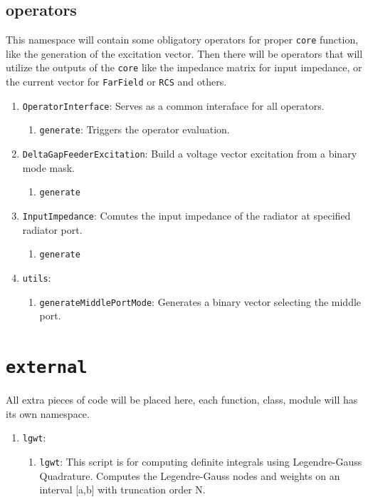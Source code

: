 \documentclass[9pt]{article}
\begin{document}
    \subsection{operators}

    This namespace will contain some obligatory operators for proper \texttt{core} function, like the generation of the excitation vector. Then there will be operators that will utilize the outputs of the \texttt{core} like the impedance matrix for input impedance, or the current vector for \texttt{FarField} or \texttt{RCS} and others.

    \begin{enumerate}[label=\Roman*.]
        \item \texttt{OperatorInterface}: Serves as a common interaface for all operators.
        \begin{enumerate}[label=\roman*.]
            \item \texttt{generate}: Triggers the operator evaluation.
        \end{enumerate}
        \item \texttt{DeltaGapFeederExcitation}: Build a voltage vector excitation from a binary mode mask.
        \begin{enumerate}[label=\roman*.]
            \item \texttt{generate}
        \end{enumerate}
        \item \texttt{InputImpedance}: Comutes the input impedance of the radiator at specified radiator port.
        \begin{enumerate}[label=\roman*.]
            \item \texttt{generate}
        \end{enumerate}
        \item \texttt{utils}:
        \begin{enumerate}[label=\roman*.]
            \item \texttt{generateMiddlePortMode}: Generates a binary vector selecting the middle port.
        \end{enumerate}
    \end{enumerate}

    \section{\texttt{external}}

    All extra pieces of code will be placed here, each function, class, module will has its own namespace.

    \begin{enumerate}[label=\Roman*.]
        \item \texttt{lgwt}:
        \begin{enumerate}[label=\roman*.]
            \item \texttt{lgwt}: This script is for computing definite integrals using Legendre-Gauss Quadrature. Computes the Legendre-Gauss nodes and weights on an interval [a,b] with truncation order N.
        \end{enumerate}
    \end{enumerate}
\end{document}
